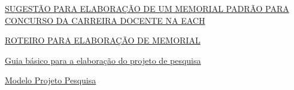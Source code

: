 \documentclass[10pt,a4paper,oneside]{book}
\begin{document}
\href{https://www.progpe.ufscar.br/arquivos/servicos/avaliacao-e-desenvolvimento/carreira-professor-magisterio-superior/anexo-3-sugestao-modelo-memorial-usp.pdf}{SUGESTÃO PARA ELABORAÇÃO DE UM MEMORIAL PADRÃO PARA CONCURSO DA
CARREIRA DOCENTE NA EACH}

\href{http://www.ufrrj.br/concursos/anexoed192006.pdf}{ROTEIRO PARA ELABORAÇÃO DE MEMORIAL}

\href{https://www.ufmg.br/proex/cpinfo/educacao/docs/06a.pdf}{Guia básico para a elaboração do projeto de pesquisa}

\href{http://portal.metodista.br/biblioteca/servicos/modelo-projeto-pesquisa}{Modelo Projeto Pesquisa}
\end{document}
